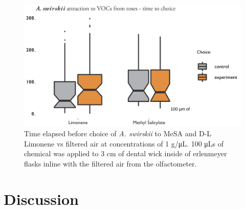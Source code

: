 \documentclass[12pt,final,CPage]{ufthesis}
\begin{document}
{\begin{figure}
  {\centering \includegraphics[width=1\linewidth]{figure/rrv_graph_olfact_vocs_time_choice} 

  }

  \caption[Time elapsed before choice of \textit{A. swirskii} to MeSA and D-L Limonene vs filtered air]{Time elapsed before choice of \textit{A. swirskii} to MeSA and D-L Limonene vs filtered air at concentrations of 1 g/\si{\micro\liter}. 100 \si{\micro\liter}s of chemical was applied to 3 cm of dental wick inside of erlenmeyer flasks inline with the filtered air from the olfactometer.}\label{fig:aswir-mesa-lim-times}
  \end{figure}
  \hypertarget{dis-vocs-olfact}{%
  \section{Discussion}\label{dis-vocs-olfact}}

}
\end{document}

